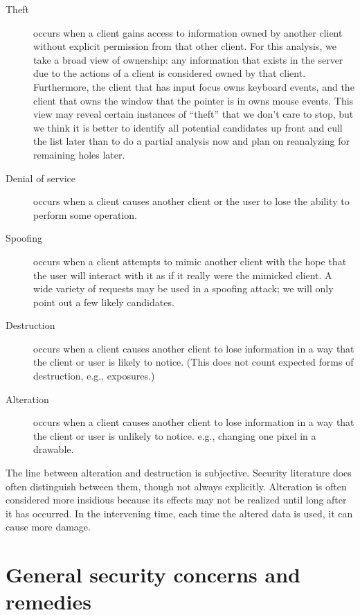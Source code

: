 \begin{description}

\item[Theft] occurs when a client gains access to information owned by
another client without explicit permission from that other client.
For this analysis, we take a broad view of ownership: any information
that exists in the server due to the actions of a client is considered
owned by that client.  Furthermore, the client that has input focus
owns keyboard events, and the client that owns the window that the
pointer is in owns mouse events.  This view may reveal certain
instances of ``theft'' that we don't care to stop, but we think it is
better to identify all potential candidates up front and cull the list
later than to do a partial analysis now and plan on reanalyzing for
remaining holes later.

\item[Denial of service] occurs when a client causes another client or
the user to lose the ability to perform some operation.

\item[Spoofing] occurs when a client attempts to mimic another client
with the hope that the user will interact with it as if it really were
the mimicked client.  A wide variety of requests may be used in a
spoofing attack; we will only point out a few likely candidates.

\item[Destruction] occurs when a client causes another client to lose
information in a way that the client or user is likely to notice.
(This does not count expected forms of destruction, e.g., exposures.)

\item[Alteration] occurs when a client causes another client to lose
information in a way that the client or user is unlikely to
notice. e.g., changing one pixel in a drawable.

\end{description}

The line between alteration and destruction is subjective.  Security
literature does often distinguish between them, though not always
explicitly.  Alteration is often considered more insidious because its
effects may not be realized until long after it has occurred.  In the
intervening time, each time the altered data is used, it can cause
more damage.



\section{General security concerns and remedies}

